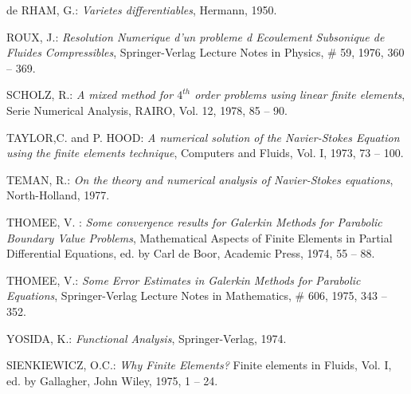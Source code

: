 \begin{thebibliography}{99}
 de RHAM, G.: \emph{Varietes differentiables}, Hermann,
  1950.

 ROUX, J.: \emph{Resolution Numerique d'un probleme d
  Ecoulement Subsonique de Fluides Compressibles}, Springer-Verlag
  Lecture Notes in Physics, \# 59, 1976, 360 -- 369.

 SCHOLZ, R.: \emph{A mixed method for $4^{th}$ order
  problems using linear finite elements}, Serie Numerical Analysis,
  RAIRO, Vol. 12, 1978, 85 -- 90.

 TAYLOR,\pageoriginale C. and P. HOOD: \emph{A
  numerical solution of the Navier-Stokes Equation using the finite
  elements technique}, Computers and Fluids, Vol. I, 1973, 73 -- 100.

 TEMAN, R.: \emph{On the theory and numerical analysis
  of Navier-Stokes equations}, North-Holland, 1977.

 THOMEE, V. : \emph{Some convergence results for
  Galerkin Methods for Parabolic Boundary Value Problems},
  Mathematical Aspects of Finite Elements in Partial Differential
  Equations, ed. by Carl de Boor, Academic Press, 1974, 55 -- 88.

 THOMEE, V.: \emph{Some Error Estimates in Galerkin
  Methods for Parabolic Equations}, Springer-Verlag Lecture Notes in
  Mathematics, \# 606, 1975, 343 -- 352.

 YOSIDA, K.: \emph{Functional Analysis},
  Springer-Verlag, 1974.

 SIENKIEWICZ, O.C.: \emph{Why Finite Elements\@?}
  Finite elements in Fluids, Vol. I, ed. by Gallagher, John Wiley,
  1975, 1 -- 24.
\end{thebibliography}




